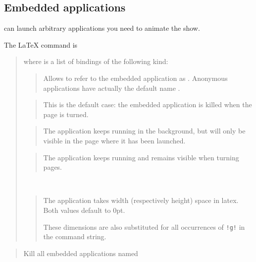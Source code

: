 \documentclass[12pt]{article}
\begin{document}
\subsection {Embedded applications}

{\ActiveDVI} can launch arbitrary applications you need to animate the
show.

The {\LaTeX} command is 

\medskip\noindent
\docdef \adviembed{} 

\begin{quote}
where  is a list of bindings of the following kind:

\begin{quote}
Allows to refer to the embedded application as . 
Anonymous applications have actually the default name .
\end{quote}


\begin{quote}
This is the default case: the embedded application is killed when the page
is turned.
\end{quote}


\begin{quote}
The application keeps running in the background, but will only be visible in
the page where it has been launched.
\end{quote}

\begin{quote}
The application keeps running and remains visible when turning pages.
\end{quote}

\\
\begin{quote}
The application takes  width (respectively height) space in 
latex. Both values default to 0pt.

These dimensions are also substituted for all occurrences of \verb"!g!" in
the command string. 
\end{quote}

\end{quote}

\medskip\noindent
\docdef \advikillembed {}
\begin{quote}
Kill all embedded applications named 
\end{quote}
\end{document}
